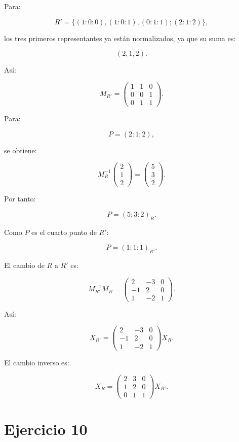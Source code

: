 \documentclass[11pt,a4paper]{article}
\begin{document}
Para:

\[
R'=
\{(1:0:0),(1:0:1),(0:1:1);(2:1:2)\},
\]

los tres primeros representantes ya están normalizados, ya que su suma es:

\[
(2,1,2).
\]

Así:

\[
M_{R'}=
\begin{pmatrix}
1&1&0\\
0&0&1\\
0&1&1
\end{pmatrix}.
\]

Para:

\[
P=(2:1:2),
\]

se obtiene:

\[
M_R^{-1}
\begin{pmatrix}
2\\1\\2
\end{pmatrix}
=
\begin{pmatrix}
5\\3\\2
\end{pmatrix}.
\]

Por tanto:

\[
\boxed{
P=(5:3:2)_R.
}
\]

Como \(P\) es el cuarto punto de \(R'\):

\[
\boxed{
P=(1:1:1)_{R'}.
}
\]

El cambio de \(R\) a \(R'\) es:

\[
M_{R'}^{-1}M_R
=
\begin{pmatrix}
2&-3&0\\
-1&2&0\\
1&-2&1
\end{pmatrix}.
\]

Así:

\[
\boxed{
X_{R'}
=
\begin{pmatrix}
2&-3&0\\
-1&2&0\\
1&-2&1
\end{pmatrix}
X_R.
}
\]

El cambio inverso es:

\[
\boxed{
X_R
=
\begin{pmatrix}
2&3&0\\
1&2&0\\
0&1&1
\end{pmatrix}
X_{R'}.
}
\]

\section{Ejercicio 10}
\end{document}
